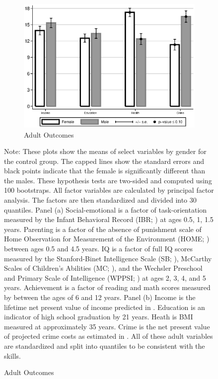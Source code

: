 \begin{figure}[!htbp]
\begin{subfigure}[h]{0.59\textwidth}
	\centering
	\caption{Adult Outcomes}
	\label{fig:intro-skills-plots-adultsimp}
	\includegraphics[width=\textwidth]{output/abccare-gdiff-adultsimp}
\end{subfigure}
\footnotesize \justify
Note: These plots show the means of select variables by gender for the control group. The capped lines show the standard errors and black points indicate that the female is significantly different than the males. These hypothesis tests are two-sided and computed using 100 bootstraps. All factor variables are calculated by principal factor analysis. The factors are then standardized and divided into 30 quantiles. Panel (a) Social-emotional is a factor of task-orientation measured by the Infant Behavioral Record (IBR; \citet{Bayley_1969_BSID-Manual}) at ages 0.5, 1, 1.5 years. Parenting is a factor of the absence of punishment scale of Home Observation for Measurement of the Environment (HOME; \citet{Elardo_Bradley_1981_DR}) between ages 0.5 and 4.5 years. IQ is a factor of full IQ scores measured by the Stanford-Binet Intelligence Scale (SB; \citet{Terman_Merrill_1960_BOOKSBintelligence}), McCarthy Scales of Children's Abilities (MC; \citet{McCarthy_1972_Manual-McCarthy-Scales}), and the Wechsler Preschool and Primary Scale of Intelligence (WPPSI; \citet{Wechsler_1974_Manual-WISC-R}) at ages 2, 3, 4, and 5 years. Achievement is a factor of reading and math scores measured by between the ages of 6 and 12 years. Panel (b) Income is the lifetime net present value of income predicted in \citet{Garcia_Heckman_Leaf_etal_2017_Comp_CBA_Unpublished}. Education is an indicator of high school graduation by 21 years. Heath is BMI measured at approximately 35 years. Crime is the net present value of projected crime costs as estimated in \citet{Garcia_Heckman_Leaf_etal_2017_Comp_CBA_Unpublished}. All of these adult variables are standardized and split into quantiles to be consistent with the skills.
\end{figure}

